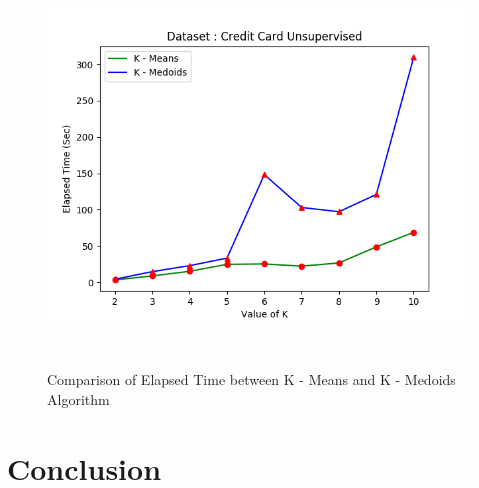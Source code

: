 \documentclass[12pt]{article}
\begin{document}
\begin{figure}[H]
	\centering
	\includegraphics[width = \linewidth, height = 10.5cm]{CreditCard.png}
	\caption{Comparison of Elapsed Time between K - Means and K - Medoids Algorithm}
	\label{fig:credit}
\end{figure}



\section{Conclusion}
\end{document}
